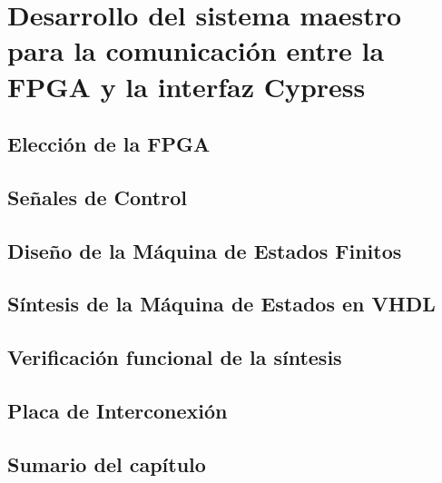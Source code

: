 \chapter{Desarrollo del sistema maestro para la comunicación entre la FPGA y la interfaz Cypress}
	\label{cap:fpga}
	
%		
	\section{Elección de la FPGA}
		\label{mats:fpga}
		
	\section{Señales de Control}
		\label{fpga:sigs}
		
	\section{Diseño de la Máquina de Estados Finitos}
		
	\section{Síntesis de la Máquina de Estados en VHDL}
		
	\section{Verificación funcional de la síntesis}
		
	\section{Placa de Interconexión}
		
	\section{Sumario del capítulo}
		